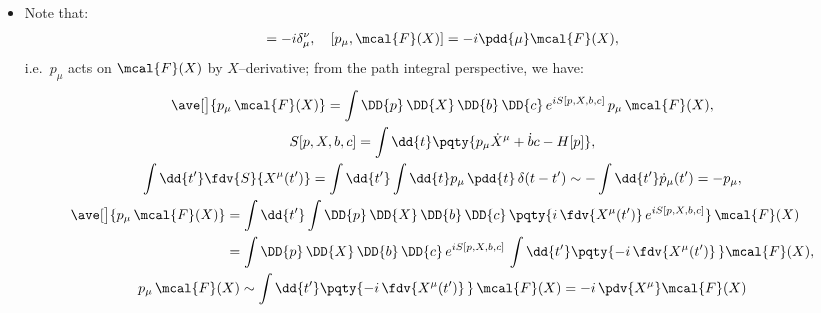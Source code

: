 \documentclass[a4paper,10pt]{article}
\begin{document}
\begin{itemize}
	\item
%	
	Note that:
	\begin{gather}
		[p_\mu,X^\nu]
		= -i\delta^\nu_\mu,\quad
		[p_\mu,\mcal{F}(X)]
		= -i\pdd{\mu} \mcal{F}(X),
	\end{gather}
	i.e.\ $p_\mu$ acts on $\mcal{F}(X)$ by $X$--derivative; from the path integral perspective, we have:
	\begin{gather}
		\allowdisplaybreaks
		\ave[\big]{p_\mu\,\mcal{F}(X)}
		= \int\DD{p}\,\DD{X}\,\DD{b}\,\DD{c}\,
			e^{iS[p,X,b,c]}\,
			p_\mu\,\mcal{F}(X), \\
		S[p,X,b,c] = \int \dd{t} \pqty{
				p_\mu \dot{X}^\mu
				+ \dot{b}c
				- H[p]
			},\\
		\int \dd{t'} \fdv{S}{X^\mu(t')}
		= \int \dd{t'} \int \dd{t} 
			p_\mu\,\pdd{t}\,\delta(t-t')
		\sim -\int \dd{t'} \dot{p}_\mu(t')
		= -p_\mu,\\
	\begin{aligned}
		\ave[\big]{p_\mu\,\mcal{F}(X)}
		&= \int \dd{t'}
			\int\DD{p}\,\DD{X}\,\DD{b}\,\DD{c}\,
			\pqty{
				i\,\fdv{X^\mu(t')}\,
				e^{iS[p,X,b,c]}
			}\,\mcal{F}(X) \\
		&= \int\DD{p}\,\DD{X}\,\DD{b}\,\DD{c}\,
			e^{iS[p,X,b,c]}\,
			\int \dd{t'}
			\pqty{
				-i\,\fdv{X^\mu(t')}\,
			} \mcal{F}(X),
	\end{aligned}\\
		p_\mu\,\mcal{F}(X)
		\sim \int \dd{t'}
			\pqty{
				-i\,\fdv{X^\mu(t')}\,
			}\,\mcal{F}(X)
		= -i\,\pdv{X^\mu} \mcal{F}(X)
	\end{gather}
	

\end{itemize}
\end{document}
